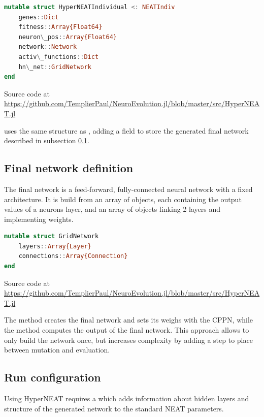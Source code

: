\begin{minipage}{\linewidth}
\begin{lstlisting}[language=Julia, caption=HyperNEAT Individual]
mutable struct HyperNEATIndividual <: NEATIndiv
    genes::Dict
    fitness::Array{Float64}
    neuron\_pos::Array{Float64}
    network::Network
    activ\_functions::Dict
    hn\_net::GridNetwork
end
\end{lstlisting}
Source code at \url{https://github.com/TemplierPaul/NeuroEvolution.jl/blob/master/src/HyperNEAT.jl}\\
\end{minipage}

 uses the same structure as , adding a  field to store the generated final network described in subsection \ref{sub:final-hn-net}.

\subsection{Final network definition}
\label{sub:final-hn-net}
The final network is a feed-forward, fully-connected neural network with a fixed architecture. It is build from an array of  objects, each containing the output values of a neurons layer, and an array of  objects linking 2 layers and implementing weights. 

\begin{minipage}{\linewidth}
\begin{lstlisting}[language=Julia, caption=HyperNEAT final network]
mutable struct GridNetwork
    layers::Array{Layer}
    connections::Array{Connection}
end
\end{lstlisting}
Source code at \url{https://github.com/TemplierPaul/NeuroEvolution.jl/blob/master/src/HyperNEAT.jl}\\
\end{minipage}

The  method creates the final network and sets its weighs with the CPPN, while the  method computes the output of the final network. This approach allows to only build the network once, but increases complexity by adding a step to place between mutation and evaluation.

\subsection{Run configuration}

Using HyperNEAT requires a  which adds information about hidden layers and structure of the generated network to the standard NEAT parameters. 


